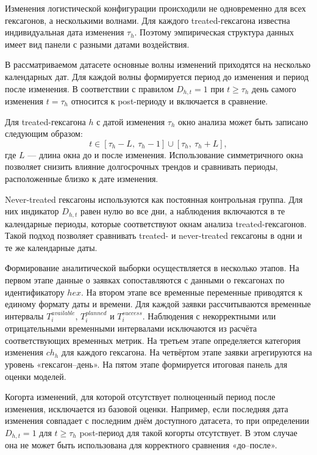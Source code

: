 \documentclass[14pt,a4paper]{extarticle}
\begin{document}
Изменения логистической конфигурации происходили не одновременно для всех гексагонов, а несколькими волнами. Для каждого treated-гексагона известна индивидуальная дата изменения \(\tau_h\). Поэтому эмпирическая структура данных имеет вид панели с разными датами воздействия.

В рассматриваемом датасете основные волны изменений приходятся на несколько календарных дат. Для каждой волны формируется период до изменения и период после изменения. В соответствии с правилом \(D_{h,t}=1\) при \(t\geq\tau_h\) день самого изменения \(t=\tau_h\) относится к post-периоду и включается в сравнение.

Для treated-гексагона \(h\) с датой изменения \(\tau_h\) окно анализа может быть записано следующим образом:
\[
t \in [\tau_h - L,\ \tau_h - 1]
\cup
[\tau_h,\ \tau_h + L],
\]
где \(L\) --- длина окна до и после изменения. Использование симметричного окна позволяет снизить влияние долгосрочных трендов и сравнивать периоды, расположенные близко к дате изменения.

Never-treated гексагоны используются как постоянная контрольная группа. Для них индикатор \(D_{h,t}\) равен нулю во все дни, а наблюдения включаются в те календарные периоды, которые соответствуют окнам анализа treated-гексагонов. Такой подход позволяет сравнивать treated- и never-treated гексагоны в одни и те же календарные даты.

Формирование аналитической выборки осуществляется в несколько этапов. На первом этапе данные о заявках сопоставляются с данными о гексагонах по идентификатору \(hex\). На втором этапе все временные переменные приводятся к единому формату даты и времени. Для каждой заявки рассчитываются временные интервалы \(T^{available}_i\), \(T^{planned}_i\) и \(T^{success}_i\). Наблюдения с некорректными или отрицательными временными интервалами исключаются из расчёта соответствующих временных метрик. На третьем этапе определяется категория изменения \(ch_h\) для каждого гексагона. На четвёртом этапе заявки агрегируются на уровень «гексагон--день». На пятом этапе формируется итоговая панель для оценки моделей.

Когорта изменений, для которой отсутствует полноценный период после изменения, исключается из базовой оценки. Например, если последняя дата изменения совпадает с последним днём доступного датасета, то при определении \(D_{h,t}=1\) для \(t\geq\tau_h\) post-период для такой когорты отсутствует. В этом случае она не может быть использована для корректного сравнения «до--после».
\end{document}
